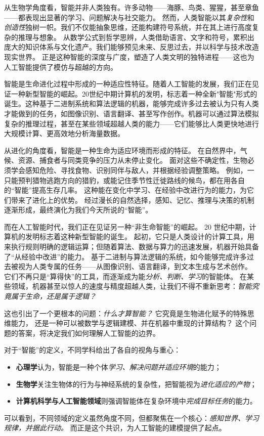 从生物学角度看，智能并非人类独有。许多动物——海豚、鸟类、猩猩，甚至章鱼——都表现出显著的学习、问题解决与社交能力。
然而，人类智能以其\emph{复杂性}和\emph{创造性}独树一帜。我们不仅能抽象思维，还能构建符号系统，并在其上进行高度复杂的推理与想象。
从数学公式到哲学思辨，人类借助语言、文字和符号，累积出庞大的知识体系与文化遗产。我们能够预见未来、反思过去，并以科学与技术改造现实世界。
正是这种智能的深度与广度，塑造了人类文明的独特进程——这也为人工智能提供了模仿与超越的方向。

智能是生命进化过程中形成的一种适应性特征。随着人工智能的发展，我们正在见证一种新型智能的崛起。20世纪中期计算机的发明，标志着一种全新"智能"形式的诞生。这种基于二进制系统和算法逻辑的机器，能够完成许多过去被认为只有人类才能做到的任务，如图像识别、语言翻译、甚至写作创作。机器可以通过算法模拟复杂的推理过程，甚至在某些领域超越人类的能力——它们能够比人类更快地进行大规模计算、更高效地分析海量数据。

从进化的角度看，智能是一种生命为适应环境而形成的特征。
在自然界中，气候、资源、捕食者与同类竞争的压力从未停止变化。
面对这些不确定性，生物必须学会感知危险、寻找食物、识别同伴与敌人，并根据经验调整策略。
例如，一只能预判猎物逃跑方向的猎豹，或能记住季节性迁徙路线的候鸟，都在用各自的“智能”提高生存几率。
这种能在变化中学习、在经验中改进行为的能力，为它们带来了进化上的优势。
经过漫长的自然选择，感知、记忆、推理与决策的机制逐渐形成，最终演化为我们今天所说的“智能”。

而在人工智能时代，我们正在见证另一种“非生命智能”的崛起。
20 世纪中期，计算机的发明标志着这种新型智能的诞生。
起初，它只是人类设计的计算工具，用来执行规则明确的逻辑运算；但随着算法、数据与算力的迅速发展，机器开始具备了“从经验中改进”的能力。
基于二进制与算法逻辑的系统，如今能够完成许多过去被视为人类专属的任务——从图像识别、语言翻译，到文本生成与艺术创作。
它们不再只是“算得快”的工具，而逐渐成为能\emph{分析、判断、学习}的智能体。
在某些领域，机器甚至以惊人的速度与精度超越人类，让我们不得不重新思考：\emph{智能究竟属于生命，还是属于逻辑？}


这也引出了一个更根本的问题：\emph{什么才算智能？}
它究竟是生物进化赋予的特殊思维能力，
还是一种可以被数学与逻辑建模、并在机器中重现的计算结构？
这个问题的答案，将决定我们如何理解人工智能的边界。


对于“智能”的定义，不同学科给出了各自的视角与重心：
\begin{itemize}
\item \textbf{心理学}认为，智能是一种个体\emph{学习、解决问题并适应环境}的能力；
\item \textbf{生物学}关注生物体的行为与神经系统的复杂性，把智能视为\emph{进化适应的产物}；
\item \textbf{计算机科学与人工智能领域}则强调智能体在复杂环境中\emph{完成目标任务}的能力。
\end{itemize}
可以看到，不同领域的定义虽然角度不同，但都聚焦在一个核心：\emph{感知世界、学习规律，并据此行动。}
而正是这个共识，为人工智能的建模提供了起点。

